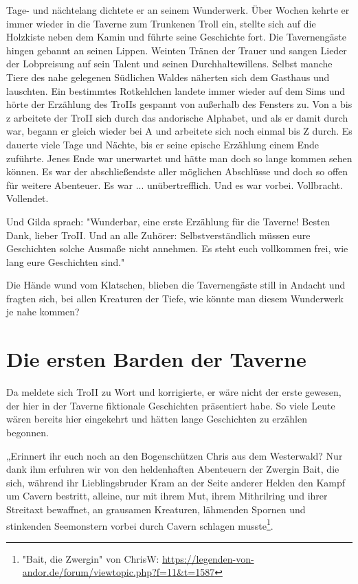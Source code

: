 Tage- und nächtelang dichtete er an seinem Wunderwerk. Über Wochen kehrte er immer wieder in die Taverne zum Trunkenen Troll ein, stellte sich auf die Holzkiste neben dem Kamin und führte seine Geschichte fort. Die Tavernengäste hingen gebannt an seinen Lippen. Weinten Tränen der Trauer und sangen Lieder der Lobpreisung auf sein Talent und seinen Durchhaltewillens. Selbst manche Tiere des nahe gelegenen Südlichen Waldes näherten sich dem Gasthaus und lauschten. Ein bestimmtes Rotkehlchen landete immer wieder auf dem Sims und hörte der Erzählung des TroIIs gespannt von außerhalb des Fensters zu. Von a bis z arbeitete der TroII sich durch das andorische Alphabet, und als er damit durch war, begann er gleich wieder bei A und arbeitete sich noch einmal bis Z durch.  Es dauerte viele Tage und Nächte, bis er seine epische Erzählung einem Ende zuführte. Jenes Ende war unerwartet und hätte man doch so lange kommen sehen können. Es war der abschließendste aller möglichen Abschlüsse und doch so offen für weitere Abenteuer. Es war ... unübertrefflich. Und es war vorbei. Vollbracht. Vollendet.

Und Gilda sprach: "Wunderbar, eine erste Erzählung für die Taverne! Besten Dank, lieber TroII. Und an alle Zuhörer: Selbstverständlich müssen eure Geschichten solche Ausmaße nicht annehmen. Es steht euch vollkommen frei, wie lang eure Geschichten sind."

Die Hände wund vom Klatschen, blieben die Tavernengäste still in Andacht und fragten sich, bei allen Kreaturen der Tiefe, wie könnte man diesem Wunderwerk je nahe kommen? 




\section{Die ersten Barden der Taverne}


Da meldete sich TroII zu Wort und korrigierte, er wäre nicht der erste gewesen, der hier in der Taverne fiktionale Geschichten präsentiert habe. So viele Leute wären bereits hier eingekehrt und hätten lange Geschichten zu erzählen begonnen.

„Erinnert ihr euch noch an den Bogenschützen Chris aus dem Westerwald? Nur dank ihm erfuhren wir von den heldenhaften Abenteuern der Zwergin Bait, die sich, während ihr Lieblingsbruder Kram an der Seite anderer Helden den Kampf um Cavern bestritt, alleine, nur mit ihrem Mut, ihrem Mithrilring und ihrer Streitaxt bewaffnet, an grausamen Kreaturen, lähmenden Spornen und stinkenden Seemonstern vorbei durch Cavern schlagen musste\footnote{"Bait, die Zwergin" von ChrisW: \url{https://legenden-von-andor.de/forum/viewtopic.php?f=11&t=1587}}.

